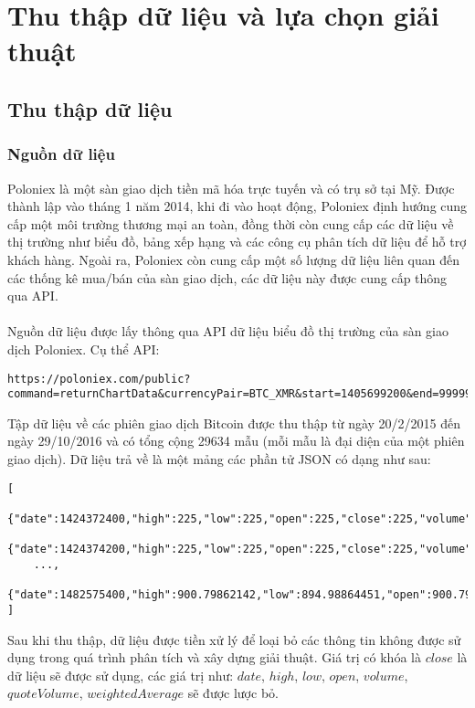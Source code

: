 \section{Thu thập dữ liệu và lựa chọn giải thuật}
\subsection{Thu thập dữ liệu}
\subsubsection{Nguồn dữ liệu}
Poloniex là một sàn giao dịch tiền mã hóa trực tuyến và có trụ sở tại Mỹ. Được 
thành lập vào tháng 1 năm 2014, khi đi vào hoạt động, Poloniex định hướng cung 
cấp một môi trường thương mại an toàn, đồng thời còn cung cấp các dữ liệu về 
thị trường như biểu đồ, bảng xếp hạng và các công cụ phân tích dữ liệu để hỗ 
trợ khách hàng. Ngoài ra, Poloniex còn cung cấp một số lượng dữ liệu liên quan 
đến các thống kê mua/bán của sàn giao dịch, các dữ liệu này được cung cấp thông qua API.\\\\ 
Nguồn dữ liệu được lấy thông qua API dữ liệu biểu đồ thị trường của sàn giao 
dịch Poloniex. Cụ thể API:
\begin{lstlisting}
https://poloniex.com/public?command=returnChartData&currencyPair=BTC_XMR&start=1405699200&end=9999999999&period=14400
\end{lstlisting}
Tập dữ liệu về các phiên giao dịch Bitcoin được thu thập từ ngày 20/2/2015 đến 
ngày 29/10/2016 và có tổng cộng 29634 mẫu (mỗi mẫu là đại diện của một phiên 
giao dịch).
Dữ liệu trả về là một mảng các phần tử JSON có dạng như sau:
\begin{lstlisting}
[
    {"date":1424372400,"high":225,"low":225,"open":225,"close":225,"volume":0.999999,"quoteVolume":0.00444444,"weightedAverage":225},
    {"date":1424374200,"high":225,"low":225,"open":225,"close":225,"volume":0,"quoteVolume":0,"weightedAverage":225},
    ...,
    {"date":1482575400,"high":900.79862142,"low":894.98864451,"open":900.79862142,"close":895.56277339,"volume":2427.10998126,"quoteVolume":2.70065724,"weightedAverage":898.71085649}
]
\end{lstlisting}
Sau khi thu thập, dữ liệu được tiền xử lý để loại bỏ các thông tin không được 
sử dụng trong quá trình phân tích và xây dựng giải thuật. Giá trị có khóa là 
$close$ là dữ liệu sẽ được sử dụng, các giá trị như: $date$, $high$, $low$, 
$open$, $volume$, $quoteVolume$, $weightedAverage$ sẽ được lược bỏ.
